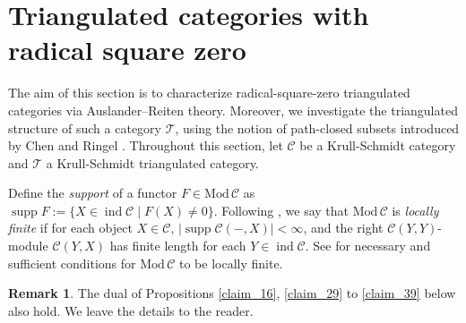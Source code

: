 \documentclass[12pt]{amsart}
\numberwithin{equation}{subsection}
\theoremstyle{plain}
\theoremstyle{definition}
\newtheorem{remark}[theorem]{Remark}
\newcommand{\supp}{\operatorname{supp}\nolimits}
\newcommand{\Mod}{\mathrm{Mod}\,}
\newcommand{\ind}{\operatorname{ind}}
\newcommand{\T}{\mathcal{T}}
\newcommand{\C}{\mathcal{C}}
\begin{document}







\section{Triangulated categories with radical square zero} 
\label{Triangulated_categories_with_radical_square_zero}






The aim of this section is to characterize radical-square-zero triangulated categories via Auslander–Reiten theory.
Moreover, we investigate the triangulated structure of such a category $\T$, using the notion of path-closed subsets introduced by Chen and Ringel \cite{Chen-Ringel_2018}. 
Throughout this section, let
$\C$ be a Krull-Schmidt category and $\T$ a Krull-Schmidt triangulated category.





Define the {\it support} of a functor $F \in \Mod\C$ as $\supp F := \{ X \in \ind\C \mid F(X) \neq 0 \}$.
Following \cite[Theorem 2.12]{Auslander_1974_II}, we say that $\Mod\C$ is {\it locally finite} if for each object $X \in\C$, $|\supp\C(-, X)| < \infty$, and the right $\C(Y, Y)$-module $\C(Y, X)$ has finite length for each $Y \in \ind\C$.
See \cite[Proposition 1.11]{Auslander_1974_II} for necessary and sufficient conditions for $\Mod\C$ to be locally finite.





\begin{remark}
The dual of Propositions \ref{claim_16}, \ref{claim_29} to \ref{claim_39} below also hold. 
We leave the details to the reader.
\end{remark}
\end{document}
